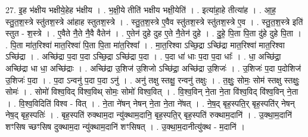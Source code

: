\documentclass[17pt]{extarticle}
\begin{document}
27. इ॒ह भ॑क्षीय भक्षीये॒हेह भ॑क्षीय । . भ॒क्षी॒ये तीति॑ भक्षीय भक्षी॒येति॑ । . इत्या॑हा॒हे तीत्या॑ह । . आ॒ह॒ स्तु॒त॒श॒स्त्रे स्तु॑तश॒स्त्रे आ॑हाह स्तुतश॒स्त्रे । . स्तु॒त॒श॒स्त्रे ए॒वैव स्तु॑तश॒स्त्रे स्तु॑तश॒स्त्रे ए॒व । . स्तु॒त॒श॒स्त्रे इति॑ स्तुत - श॒स्त्रे । . ए॒वैते नै॒ते नै॒वै वैतेन॑ । . ए॒तेन॑ दुहे दुह ए॒ते नै॒तेन॑ दुहे । . दु॒हे॒ पि॒ता पि॒ता दु॑हे दुहे पि॒ता । . पि॒ता मा॑त॒रिश्वा॑ मात॒रिश्वा॑ पि॒ता पि॒ता मा॑त॒रिश्वा᳚ । . मा॒त॒रिश्वा ऽच्छि॒द्रा ऽच्छि॑द्रा मात॒रिश्वा॑ मात॒रिश्वा ऽच्छि॑द्रा । . अच्छि॑द्रा प॒दा प॒दा ऽच्छि॒द्रा ऽच्छि॑द्रा प॒दा । . प॒दा धा॑ धाः प॒दा प॒दा धाः᳚ । . धा॒ अच्छि॑द्रा॒ अच्छि॑द्रा धा धा॒ अच्छि॑द्राः । . अच्छि॑द्रा उ॒शिज॑ उ॒शिजो ऽच्छि॑द्रा॒ अच्छि॑द्रा उ॒शिजः॑ । . उ॒शिजः॑ प॒दा प॒दोशिज॑ उ॒शिजः॑ प॒दा । . प॒दा ऽन्वनु॑ प॒दा प॒दा ऽनु॑ । . अनु॑ तक्षु स्तक्षु॒ रन्वनु॑ तक्षुः । . त॒क्षुः॒ सोमः॒ सोम॑ स्तक्षु स्तक्षुः॒ सोमः॑ । . सोमो॑ विश्व॒विद् वि॑श्व॒विथ् सोमः॒ सोमो॑ विश्व॒वित् । . वि॒श्व॒विन् ने॒ता ने॒ता वि॑श्व॒विद् वि॑श्व॒विन् ने॒ता । . वि॒श्व॒विदिति॑ विश्व - वित् । . ने॒ता ने॑षन् नेषन् ने॒ता ने॒ता ने॑षत् । . ने॒ष॒द् बृह॒स्पति॒र् बृह॒स्पति॑र् नेषन् नेष॒द् बृह॒स्पतिः॑ । . बृह॒स्पति॑ रुक्थाम॒दा न्यु॑क्थाम॒दानि॒ बृह॒स्पति॒र् बृह॒स्पति॑ रुक्थाम॒दानि॑ । . उ॒क्था॒म॒दानि॑ शꣳसिष च्छꣳसिष दुक्थाम॒दा न्यु॑क्थाम॒दानि॑ शꣳसिषत् । . उ॒क्था॒म॒दानीत्यु॑क्थ - म॒दानि॑ । \newline
\end{document}
